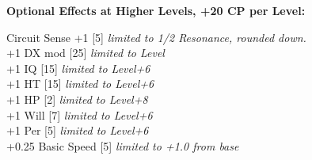 \begin{multicols*}{3}
\textbf{Optional Effects at Higher Levels, +20 CP per Level:}

Circuit Sense +1 [5] \textit{limited to 1/2 Resonance, rounded down.}\\
+1 DX mod [25] \textit{limited to Level}\\
+1 IQ [15] \textit{limited to Level+6}\\
+1 HT [15] \textit{limited to Level+6}\\
+1 HP [2] \textit{limited to Level+8}\\
+1 Will [7] \textit{limited to Level+6}\\
+1 Per [5] \textit{limited to Level+6}\\
+0.25 Basic Speed [5] \textit{limited to +1.0 from base}\\
	
\end{multicols*}
